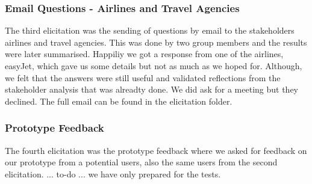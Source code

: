 \subsubsection{Email Questions - Airlines and Travel Agencies}
The third elicitation was the sending of questions by email to the stakeholders airlines and travel agencies. This was done by two group members and the results were later summarised. Happiliy we got a response from one of the airlines, easyJet, which gave us some details but not as much as we hoped for. Although, we felt that the answers were still useful and validated reflections from the stakeholder analysis that was alreadty done. We did ask for a meeting but they declined. The full email can be found in the elicitation folder.

\subsubsection{Prototype Feedback}
The fourth elicitation was the prototype feedback where we asked for feedback on our prototype from a potential users, also the same users from the second elicitation. 
... to-do ... we have only prepared for the tests.
